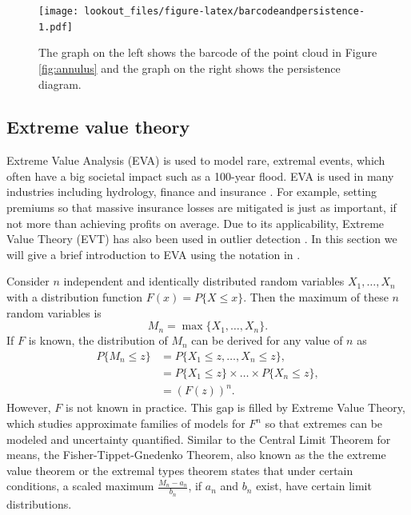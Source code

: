 \documentclass[11pt,a4paper,]{article}
\theoremstyle{definition}
\theoremstyle{definition}
\theoremstyle{definition}
\theoremstyle{remark}
\begin{document}
\begin{figure}
\centering
\texttt{[image: lookout\_files/figure-latex/barcodeandpersistence-1.pdf]}
\caption{\label{fig:barcodeandpersistence}The graph on the left shows the barcode of the point cloud in Figure \ref{fig:annulus} and the graph on the right shows the persistence diagram.}
\end{figure}

\hypertarget{subsec:evt}{%
\subsection{Extreme value theory}\label{subsec:evt}}

Extreme Value Analysis (EVA) is used to model rare, extremal events, which often have a big societal impact such as a 100-year flood. EVA is used in many industries including hydrology, finance and insurance \autocite{Reiss2001}. For example, setting premiums so that massive insurance losses are mitigated is just as important, if not more than achieving profits on average. Due to its applicability, Extreme Value Theory (EVT) has also been used in outlier detection \autocite{wilkinson2017visualizing,talagala2019anomaly}. In this section we will give a brief introduction to EVA using the notation in \textcite{coles2001introduction}.

Consider \(n\) independent and identically distributed random variables \(X_1, \dots, X_n\) with a distribution function \(F(x) = P\{X \leq x\}\). Then the maximum of these \(n\) random variables is
\begin{equation}\label{eq:evt1}
    M_n = \max \{X_1, \dots, X_n\} .
\end{equation}
If \(F\) is known, the distribution of \(M_n\) can be derived for any value of \(n\) as
\begin{align}\label{eq:evt2}
    P\{M_n \leq z \}
     & = P\{X_1 \leq z,  \dots,  X_n \leq z \} ,          \\
     & = P\{X_1 \leq z\} \times \dots \times P\{X_n \leq z\} , \\
     & = \left(F(z)\right)^n  .
\end{align}
However, \(F\) is not known in practice. This gap is filled by Extreme Value Theory, which studies approximate families of models for \(F^n\) so that extremes can be modeled and uncertainty quantified. Similar to the Central Limit Theorem for means, the Fisher-Tippet-Gnedenko Theorem, also known as the the extreme value theorem or the extremal types theorem states that under certain conditions, a scaled maximum \(\frac{M_n - a_n}{b_n}\), if \(a_n\) and \(b_n\) exist, have certain limit distributions.
\end{document}
